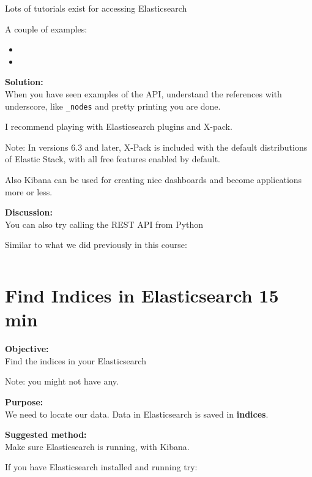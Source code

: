 \documentclass[a4paper,11pt,notitlepage]{report}
\begin{document}
Lots of tutorials exist for accessing Elasticsearch

A couple of examples:
\begin{itemize}
\item {}
\item {}
\end{itemize}

{\bf Solution:}\\
When you have seen examples of the API, understand the references with underscore, like \verb+_nodes+ and pretty printing you are done.

I recommend playing with Elasticsearch plugins and X-pack.\\

Note: In versions 6.3 and later, X-Pack is included with the default distributions of Elastic Stack, with all free features enabled by default.

Also Kibana can be used for creating nice dashboards and become applications more or less.

{\bf Discussion:}\\
You can also try calling the REST API from Python

Similar to what we did previously in this course:
\inputminted{python}{programs/rest-1.py}



\chapter{Find Indices in Elasticsearch 15 min}
\label{ex:es-find-indices}

{\bf Objective:}\\
Find the indices in your Elasticsearch

Note: you might not have any.

{\bf Purpose:}\\
We need to locate our data. Data in Elasticsearch is saved in {\bf indices}.


{\bf Suggested method:}\\
Make sure Elasticsearch is running, with Kibana.

If you have Elasticsearch installed and running try: 
\end{document}
